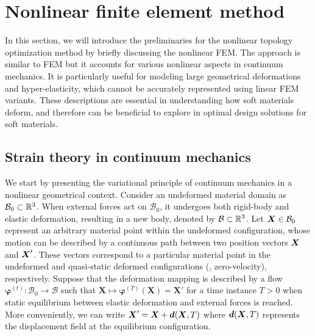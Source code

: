 \section{Nonlinear finite element method} \label{chap:fem}
In this section, we will introduce the preliminaries for the nonlinear topology optimization method by briefly discussing the nonlinear FEM. The approach is similar to FEM but it accounts for various nonlinear aspects in continuum mechanics. It is particularly useful for modeling large geometrical deformations and hyper-elasticity, which cannot be accurately represented using linear FEM variants. These descriptions are essential in understanding how soft materials deform, and therefore can be beneficial to explore in optimal design solutions for soft materials.

\subsection{Strain theory in continuum mechanics}
We start by presenting the variational principle of continuum mechanics in a nonlinear geometrical context. Consider an undeformed material domain as $\mathcal{B}_0 \subset \mathbb{R}^3$. When external forces act on $\mathcal{B}_0$, it undergoes both rigid-body and elastic deformation, resulting in a new body, denoted by $\mathcal{B} \subset \mathbb{R}^3$. Let ${\boldsymbol{X}} \in \mathcal{B}_0$ represent an arbitrary material point within the undeformed configuration, whose motion can be described by a continuous path between two position vectors ${\boldsymbol{X}}$ and ${\boldsymbol{X}}'$. These vectors correspond to a particular material point in the undeformed and quasi-static deformed configurations (\ie, zero-velocity), respectively. Suppose that the deformation mapping is described by a flow $\boldsymbol{\varphi}^{(t)}: \mathcal{B}_0 \to \mathcal{B}$ such that $\boldsymbol{X} \mapsto \boldsymbol{\varphi}^{(T)}(\boldsymbol{X}) = \boldsymbol{X}'$ for a time instance $T > 0$ when static equilibrium between elastic deformation and external forces is reached. More conveniently, we can write $\boldsymbol{X}' = \boldsymbol{X} + {\boldsymbol{d}}(\boldsymbol{X},T)$ where ${\boldsymbol{d}}({\boldsymbol{X}},T)$ represents the displacement field at the equilibrium configuration.

